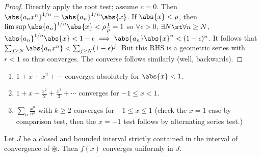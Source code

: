 \begin{proof}
    Directly apply the root test; assume $c = 0$. Then $\abs{a_n x^n}^{1/n} = \abs{a_n}^{1/n} \abs{x}$. If $\abs{x} < \rho$, then $\limsup \abs{a_n}^{1/n} \abs{x} < \rho \frac{1}{\rho}= 1$ so $\forall \epsilon > 0$, $\exists N \st \forall n \geq N$, $\abs{a_n}^{1/n}\abs{x} < 1 - \epsilon \implies \abs{a_n} \abs{x}^n < (1 - \epsilon)^n$. It follows that $\sum_{j \geq N} \abs{a_n x^n}< \sum_{j \geq N} (1 - \epsilon)^j$. But this RHS is a geometric series with $r < 1$ so thus converges. The converse follows similarly (well, backwards).
\end{proof}
\begin{example}
    \begin{enumerate}
        \item $1 + x + x^2 + \cdots$ converges absolutely for $\abs{x} < 1$.
        \item $1 + x + \frac{x^2}{2} + \frac{x^3}{3} + \cdots$ converges for $-1 \leq x < 1$.
        \item $\sum_n \frac{x^n}{n^k}$ with $k \geq 2$ converges for $-1 \leq x \leq 1$ (check the $x = 1$ case by comparison test, then the $x = -1$ test follows by alternating series test.)
    \end{enumerate}
\end{example}

\begin{theorem}
    Let $J$ be a closed and bounded interval strictly contained in the interval of convergence of $\circledast$. Then $f(x)$ converges uniformly in $J$.
\end{theorem}